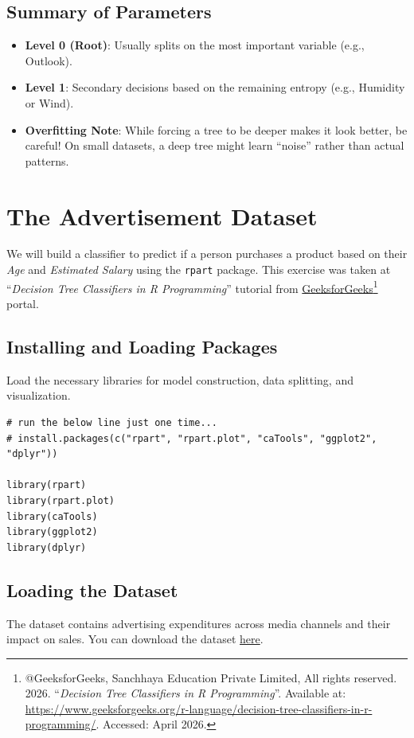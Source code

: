\documentclass{article}
\begin{document}
\subsection{Summary of Parameters}
\begin{itemize}
    \item \textbf{Level 0 (Root)}: Usually splits on the most important variable (e.g., Outlook).
    \item \textbf{Level 1}: Secondary decisions based on the remaining entropy (e.g., Humidity or Wind).
    \item \textbf{Overfitting Note}: While forcing a tree to be deeper makes it look better, be careful! On small datasets, a deep tree might learn ``noise'' rather than actual patterns.
\end{itemize}

\section{The Advertisement Dataset} \label{sec:ad}
We will build a classifier to predict if a person purchases a product based on their \textit{Age} and \textit{Estimated Salary} using the \texttt{rpart} package.  This exercise was taken at ``\textit{Decision Tree Classifiers in R Programming}'' tutorial from \href{https://www.geeksforgeeks.org}{GeeksforGeeks}\footnote{@GeeksforGeeks, Sanchhaya Education Private Limited, All rights reserved.  2026. ``\textit{Decision Tree Classifiers in R Programming}''. Available at: \url{https://www.geeksforgeeks.org/r-language/decision-tree-classifiers-in-r-programming/}. Accessed:  April 2026.} portal.

\subsection{Installing and Loading Packages}
Load the necessary libraries for model construction, data splitting, and visualization.

\begin{verbatim}
# run the below line just one time...
# install.packages(c("rpart", "rpart.plot", "caTools", "ggplot2", "dplyr"))

library(rpart)
library(rpart.plot)
library(caTools)
library(ggplot2)
library(dplyr)
\end{verbatim}

\subsection{Loading the Dataset}
The dataset contains advertising expenditures across media channels and their impact on sales.  You can download the dataset \href{https://drive.google.com/file/d/1uFJtgMXrU2W9v6Pp6V1AsN8FSvicEgI5/view?usp=sharing}{here}.
\end{document}
